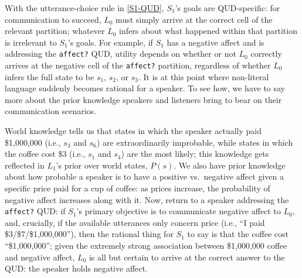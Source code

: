 \documentclass{sp}
\begin{document}
With the utterance-choice rule in \eqref{S1-QUD}, $S_1$'s goals are QUD-specific: for communication to succeed, $L_0$ must simply arrive at the correct cell of the relevant partition; whatever $L_0$ infers about what happened within that partition is irrelevant to $S_1$'s goals. For example, if $S_1$ has a negative affect and is addressing the \texttt{affect?} QUD, utility depends on whether or not $L_0$ correctly arrives at the negative cell of the \texttt{affect?} partition, regardless of whether $L_0$ infers the full state to be $s_1$, $s_2$, or $s_3$. It is at this point where non-literal language suddenly becomes rational for a speaker. To see how, we have to say more about the prior knowledge speakers and listeners bring to bear on their communication scenarios.

World knowledge tells us that states in which the speaker actually paid \$1,000,000 (i.e., $s_3$ and $s_6$) are extraordinarily improbable, while states in which the coffee cost \$3 (i.e., $s_1$ and $s_4$) are the most likely; this knowledge gets reflected in $L_1$'s prior over world states, $P(s)$. We also have prior knowledge about how probable a speaker is to have a positive vs.~negative affect given a specific price paid for a cup of coffee: as prices increase, the probability of negative affect increases along with it. Now, return to a speaker addressing the \texttt{affect?} QUD: if $S_1$'s primary objective is to communicate negative affect to $L_0$, and, crucially, if the available utterances only concern price (i.e., ``I paid \$3/\$7/\$1,000,000''), then the rational thing for $S_1$ to say is that the coffee cost ``\$1,000,000''; given the extremely strong association between \$1,000,000 coffee and negative affect, $L_0$ is all but certain to arrive at the correct answer to the QUD: the speaker holds negative affect.
\end{document}
